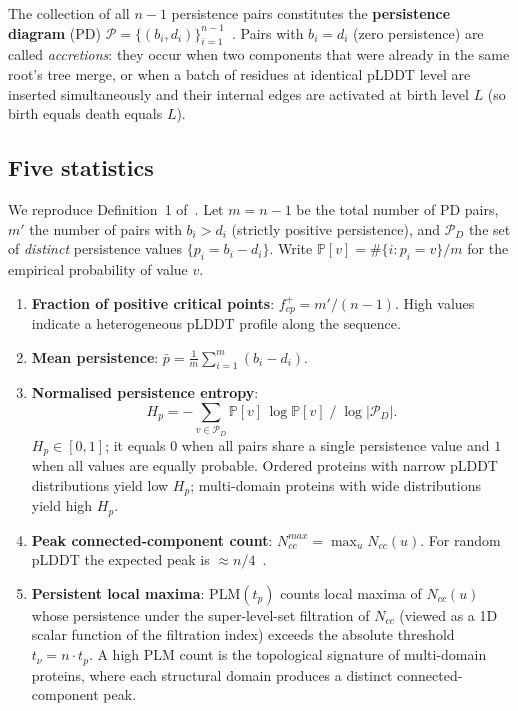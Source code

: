 The collection of all $n{-}1$ persistence pairs constitutes the
\textbf{persistence diagram} (PD)
$\mathcal{P} = \{(b_i, d_i)\}_{i=1}^{n-1}$~\cite{edelsbrunner2010computational}.
Pairs with $b_i = d_i$ (zero persistence) are called \emph{accretions}:
they occur when two components that were already in the same root's tree
merge, or when a batch of residues at identical pLDDT level are inserted
simultaneously and their internal edges are activated at birth level $L$
(so birth equals death equals $L$).

\subsection{Five statistics}
\label{sec:bg_stats}

We reproduce Definition~1 of~\cite{cazals2025alphafold}.
Let $m = n{-}1$ be the total number of PD pairs, $m'$ the number of pairs
with $b_i > d_i$ (strictly positive persistence), and
$\mathcal{P}_D$ the set of \emph{distinct} persistence values
$\{p_i = b_i - d_i\}$.
Write $\mathbb{P}[v] = \#\{i : p_i = v\}/m$ for the empirical probability of
value $v$.

\begin{enumerate}
  \item \textbf{Fraction of positive critical points}:
        $f^+_{cp} = m'/(n{-}1)$.
        High values indicate a heterogeneous pLDDT profile along the sequence.

  \item \textbf{Mean persistence}:
        $\bar{p} = \frac{1}{m}\sum_{i=1}^{m}(b_i - d_i)$.

  \item \textbf{Normalised persistence entropy}:
        \begin{equation}
          H_p = -\sum_{v \in \mathcal{P}_D} \mathbb{P}[v]\,\log\mathbb{P}[v]
                \;\Big/\;\log|\mathcal{P}_D|.
          \label{eq:Hp}
        \end{equation}
        $H_p \in [0,1]$; it equals $0$ when all pairs share a single
        persistence value and $1$ when all values are equally probable.
        Ordered proteins with narrow pLDDT distributions yield low $H_p$;
        multi-domain proteins with wide distributions yield high $H_p$.

  \item \textbf{Peak connected-component count}:
        $N_{cc}^{max} = \max_u N_{cc}(u)$.
        For random pLDDT the expected peak is $\approx n/4$~\cite{cazals2025alphafold}.

  \item \textbf{Persistent local maxima}:
        $\mathrm{PLM}(t_p)$ counts local maxima of $N_{cc}(u)$ whose
        persistence under the super-level-set filtration of $N_{cc}$
        (viewed as a 1D scalar function of the filtration index) exceeds
        the absolute threshold $t_\nu = n \cdot t_p$.
        A high PLM count is the topological signature of multi-domain
        proteins, where each structural domain produces a distinct
        connected-component peak.
\end{enumerate}

